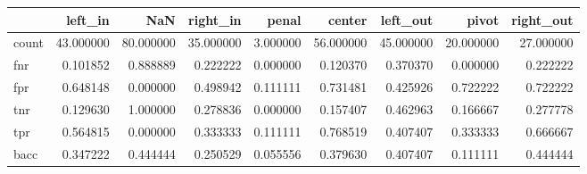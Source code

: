 \begin{tabular}{lrrrrrrrr}
\toprule
{} &    left\_in &        NaN &   right\_in &     penal &     center &   left\_out &      pivot &  right\_out \\
\midrule
count &  43.000000 &  80.000000 &  35.000000 &  3.000000 &  56.000000 &  45.000000 &  20.000000 &  27.000000 \\
fnr   &   0.101852 &   0.888889 &   0.222222 &  0.000000 &   0.120370 &   0.370370 &   0.000000 &   0.222222 \\
fpr   &   0.648148 &   0.000000 &   0.498942 &  0.111111 &   0.731481 &   0.425926 &   0.722222 &   0.722222 \\
tnr   &   0.129630 &   1.000000 &   0.278836 &  0.000000 &   0.157407 &   0.462963 &   0.166667 &   0.277778 \\
tpr   &   0.564815 &   0.000000 &   0.333333 &  0.111111 &   0.768519 &   0.407407 &   0.333333 &   0.666667 \\
bacc  &   0.347222 &   0.444444 &   0.250529 &  0.055556 &   0.379630 &   0.407407 &   0.111111 &   0.444444 \\
\bottomrule
\end{tabular}
